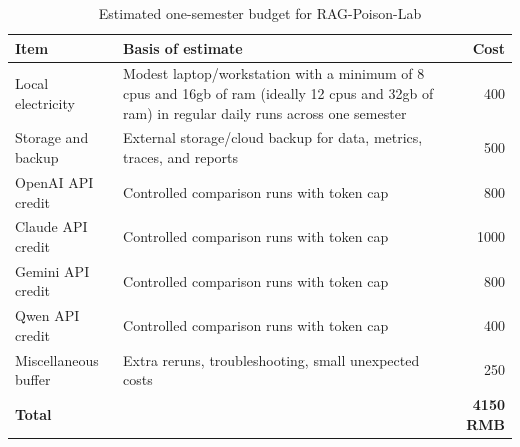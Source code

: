 \begin{table}[H]
  \centering
  \caption{Estimated one-semester budget for RAG-Poison-Lab}
  \label{tab:budget-cny}
  \begin{tabular}{p{} p{} r}
    \toprule
    Item & Basis of estimate & Cost \\
    \midrule
    Local electricity & Modest laptop/workstation with a minimum of 8 cpus and 16gb of ram (ideally 12 cpus and 32gb of ram) in regular daily runs across one semester & 400 \\
    Storage and backup & External storage/cloud backup for data, metrics, traces, and reports & 500 \\
    OpenAI API credit & Controlled comparison runs with token cap & 800 \\
    Claude API credit & Controlled comparison runs with token cap & 1000 \\
    Gemini API credit & Controlled comparison runs with token cap & 800 \\
    Qwen API credit & Controlled comparison runs with token cap & 400 \\
    Miscellaneous buffer & Extra reruns, troubleshooting, small unexpected costs & 250 \\
    \midrule
    \textbf{Total} &  & \textbf{4150 RMB} \\
    \bottomrule
  \end{tabular}
\end{table}
